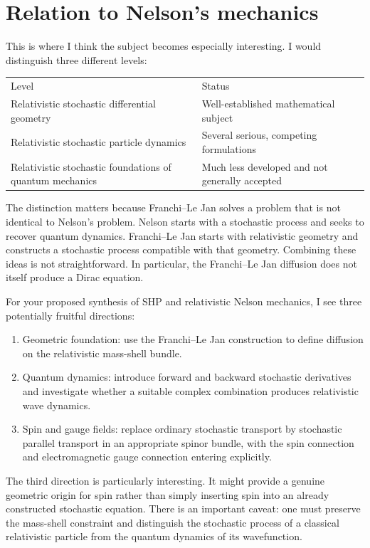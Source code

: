 \section{ Relation to Nelson's mechanics}
This is where I think the subject becomes especially interesting.
I would distinguish three different levels:
\begin{table}[h]
    \begin{tabular}{p{}p{}}
        Level&	Status\\
        Relativistic stochastic differential geometry&	Well-established mathematical subject\\
        Relativistic stochastic particle dynamics&	Several serious, competing formulations\\
        Relativistic stochastic foundations of quantum mechanics&	Much less developed and not generally accepted\\      
    \end{tabular}
\end{table}
The distinction matters because Franchi–Le Jan solves a problem that is not identical to Nelson's problem.
Nelson starts with a stochastic process and seeks to recover quantum dynamics.
Franchi–Le Jan starts with relativistic geometry and constructs a stochastic process compatible with that geometry.
Combining these ideas is not straightforward. In particular, the Franchi–Le Jan diffusion does not itself produce a Dirac equation.

For your proposed synthesis of SHP and relativistic Nelson mechanics, I see three potentially fruitful directions:
\begin{enumerate}
   \item Geometric foundation: use the Franchi–Le Jan construction to define diffusion on the relativistic mass-shell bundle.
   \item Quantum dynamics: introduce forward and backward stochastic derivatives and investigate whether a suitable complex combination produces relativistic wave dynamics.
   \item Spin and gauge fields: replace ordinary stochastic transport by stochastic parallel transport in an appropriate spinor bundle, with the spin connection and electromagnetic gauge connection entering explicitly.
\end{enumerate}
The third direction is particularly interesting. It might provide a genuine geometric origin for spin rather than simply inserting spin into an already constructed stochastic equation.
There is an important caveat: one must preserve the mass-shell constraint and distinguish the stochastic process of a classical relativistic particle from the quantum dynamics of its wavefunction.

